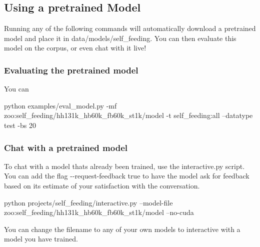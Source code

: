 \subsection*{Using a pretrained Model}

Running any of the following commands will automatically download a pretrained model and place it in {\ttfamily data/models/self\+\_\+feeding}. You can then evaluate this model on the corpus, or even chat with it live!

\subsubsection*{Evaluating the pretrained model}

You can


\begin{DoxyCode}
python examples/eval\_model.py -mf zoo:self\_feeding/hh131k\_hb60k\_fb60k\_st1k/model -t self\_feeding:all
       --datatype test -bs 20
\end{DoxyCode}


\subsubsection*{Chat with a pretrained model}

To chat with a model that\textquotesingle{}s already been trained, use the {\ttfamily interactive.\+py} script. You can add the flag {\ttfamily -\/-\/request-\/feedback true} to have the model ask for feedback based on its estimate of your satisfaction with the conversation. 
\begin{DoxyCode}
python projects/self\_feeding/interactive.py --model-file zoo:self\_feeding/hh131k\_hb60k\_fb60k\_st1k/model
       --no-cuda
\end{DoxyCode}


You can change the filename to any of your own models to interactive with a model you have trained. 